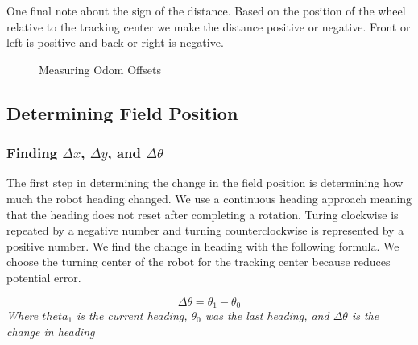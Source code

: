 \documentclass[12pt]{report}
\begin{document}
One final note about the sign of the distance.
Based on the position of the wheel relative to the tracking center we make the distance positive or negative.
Front or left is positive and back or right is negative.

\def\wheelSize{1.5}
\begin{figure}[h]
 \caption{Measuring Odom Offsets}
 \label{FIG::odom_offsets}
 \centering
 \label{odom_offset_diagram}
\end{figure}


\pagebreak
\subsection{Determining Field Position}
\subsubsection{Finding $\Delta x$, $\Delta y$, and $\Delta\theta$}
The first step in determining the change in the field position is determining how much the robot heading changed. 
We use a continuous heading approach meaning that the heading does not reset after completing a rotation.
Turing clockwise is repeated by a negative number and turning counterclockwise is represented by a positive number.
We find the change in heading with the following formula.
We choose the turning center of the robot for the tracking center because reduces potential error.

$$
    \Delta \theta = \theta_1-\theta_0
$$
\textit{Where $theta_1$ is the current heading, $\theta_0$ was the last heading, and $\Delta \theta$ is the change in heading}
\end{document}
